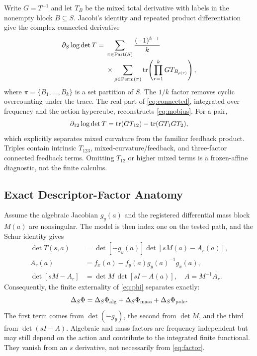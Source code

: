 Write $G=T^{-1}$ and let $T_B$ be the mixed total derivative with labels in the
nonempty block $B\subseteq S$. Jacobi's identity and repeated product
differentiation give the complex connected derivative
\begin{equation}
\begin{aligned}
\partial_S\log\det T
={}&\sum_{\pi\in\operatorname{Part}(S)}\frac{(-1)^{k-1}}{k}\\[-2pt]
&\times\sum_{\rho\in\operatorname{Perm}(\pi)}
\operatorname{tr}\!\left(\prod_{r=1}^{k}GT_{B_{\rho(r)}}\right),
\end{aligned}
\label{eq:connected}
\end{equation}
where $\pi=\{B_1,\ldots,B_k\}$ is a set partition of $S$. The $1/k$
factor removes cyclic overcounting under the trace. The real part of
\eqref{eq:connected}, integrated over frequency and the action hypercube,
reconstructs \eqref{eq:mobius}. For a pair,
\begin{equation}
\partial_{12}\log\det T
=\operatorname{tr}(GT_{12})-\operatorname{tr}(GT_1GT_2),
\label{eq:pair}
\end{equation}
which explicitly separates mixed curvature from the familiar feedback
product. Triples contain intrinsic $T_{123}$, mixed-curvature/feedback, and
three-factor connected feedback terms. Omitting $T_{12}$ or higher mixed
terms is a frozen-affine diagnostic, not the finite calculus.

\subsection{Exact Descriptor-Factor Anatomy}

Assume the algebraic Jacobian $g_y(a)$ and the registered differential mass
block $M(a)$ are nonsingular. The model is then index one on the tested path,
and the Schur identity gives
\begin{align}
\det T(s,a)
&=\det[-g_y(a)]\det[sM(a)-A_r(a)] ,\label{eq:schur1}\\
A_r(a)&=f_x(a)-f_y(a)g_y(a)^{-1}g_x(a),\label{eq:ared}\\
\det[sM-A_r]&=\det M\,\det[sI-A(a)],\quad
A=M^{-1}A_r.\label{eq:schur2}
\end{align}
Consequently, the finite externality of \eqref{eq:phi} separates exactly:
\begin{equation}
\Delta_{S}\Phi=
\Delta_{S}\Phi_{\mathrm{alg}}+
\Delta_{S}\Phi_{\mathrm{mass}}+
\Delta_{S}\Phi_{\mathrm{pole}}.
\label{eq:factor}
\end{equation}
The first term comes from $\det(-g_y)$, the second from $\det M$, and the
third from $\det(sI-A)$. Algebraic and mass factors are frequency independent
but may still depend on the action and contribute to the integrated finite
functional. They vanish from an $s$ derivative, not necessarily from
\eqref{eq:factor}.

